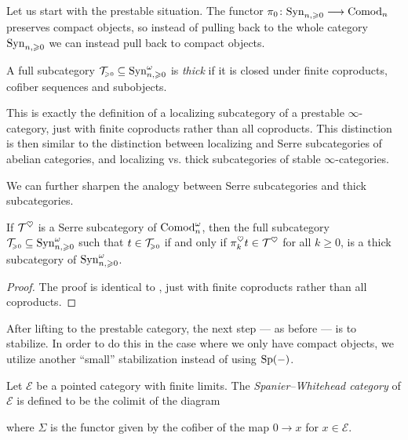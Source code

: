 Let us start with the prestable situation. The functor $\pi_0 \colon \mathrm{Syn}_{n, \geqslant 0} \longrightarrow \mathrm{Comod}_n$ preserves compact objects, so instead of pulling back to the whole category $\mathrm{Syn}_{n, \geqslant 0}$ we can instead pull back to compact objects. 

\begin{definition}
    A full subcategory $\mathcal{T}_{\hspace{-1pt}\scriptscriptstyle\geqslant 0} \subseteq \mathrm{Syn}_{n, \geqslant 0}^\omega$ is \emph{thick} if it is closed under finite coproducts, cofiber sequences and subobjects. 
\end{definition}

\begin{remark}
    This is exactly the definition of a localizing subcategory of a prestable $\infty$-category, just with finite coproducts rather than all coproducts. This distinction is then similar to the distinction between localizing and Serre subcategories of abelian categories, and localizing vs. thick subcategories of stable $\infty$-categories. 
\end{remark}

We can further sharpen the analogy between Serre subcategories and thick subcategories. 

\begin{lemma}
    If $\mathcal{T}^\heartsuit$ is a Serre subcategory of $\mathrm{Comod}_n^\omega$, then the full subcategory $\mathcal{T}_{\hspace{-1pt}\scriptscriptstyle\geqslant 0}\subseteq \mathrm{Syn}_{n, \geqslant 0}^\omega$ such that $t\in \mathcal{T}_{\hspace{-1pt}\scriptscriptstyle\geqslant 0}$ if and only if $\pi^\heartsuit_k t \in \mathcal{T}^\heartsuit$ for all $k\geq 0$, is a thick subcategory of $\mathrm{Syn}_{n, \geqslant 0}^\omega$. 
\end{lemma}
\begin{proof}
    The proof is identical to \cite[C.5.2.7]{lurie_SAG}, just with finite coproducts rather than all coproducts. 
\end{proof}

After lifting to the prestable category, the next step --- as before --- is to stabilize. In order to do this in the case where we only have compact objects, we utilize another ``small'' stabilization instead of using $\mathrm{Sp}(-)$. 

\begin{definition}
    Let $\mathcal{E}$ be a pointed category with finite limits. The \emph{Spanier--Whitehead category} of $\mathcal{E}$ is defined to be the colimit of the diagram 
    \begin{center}
    \end{center}
    where $\Sigma$ is the functor given by the cofiber of the map $0\rightarrow x$ for $x\in \mathcal{E}$. 
\end{definition}

